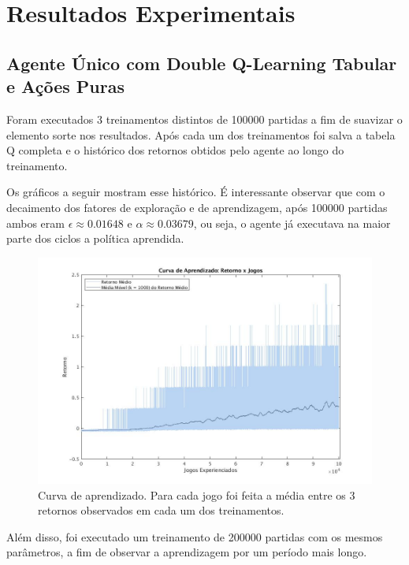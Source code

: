 \chapter{Resultados Experimentais \label{chap:Resultados}}



\section{Agente Único com Double Q-Learning Tabular e Ações Puras}

Foram executados 3 treinamentos distintos de 100000 partidas a fim de suavizar o elemento sorte nos resultados. Após cada um dos treinamentos foi salva a tabela Q completa e o histórico dos retornos obtidos pelo agente ao longo do treinamento.

Os gráficos a seguir mostram esse histórico. É interessante observar que com o decaimento dos fatores de exploração e de aprendizagem, após 100000 partidas ambos eram $\epsilon \approx 0.01648$ e $\alpha \approx 0.03679$, ou seja, o agente já executava na maior parte dos ciclos a política aprendida.

\begin{figure}[h]
	\includegraphics[width=0.8\linewidth]{figs/curva-qtabular.jpg}
	\centering
	\caption{Curva de aprendizado. Para cada jogo foi feita a média entre os 3 retornos observados em cada um dos treinamentos.}
	\label{fig:single-agent-curva}
\end{figure}

Além disso, foi executado um treinamento de 200000 partidas com os mesmos parâmetros, a fim de observar a aprendizagem por um período mais longo.

